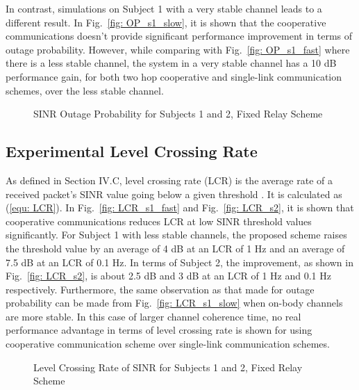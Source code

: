 \documentclass[12pt,draftcls,a4paper,onecolumn,journal]{IEEEtran}
\begin{document}
In contrast, simulations on Subject 1 with a very stable channel leads to a different result. In Fig.~\ref{fig: OP_s1_slow}, it is shown that the cooperative communications doesn't provide significant performance improvement in terms of outage probability. However, while comparing with Fig.~\ref{fig: OP_s1_fast} where there is a less stable channel, the system in a very stable channel has a 10 dB  performance gain, for both two hop cooperative and single-link communication schemes, over the less stable channel.

\begin{figure}[]
\centering
{}
\caption{SINR Outage Probability for Subjects 1 and 2, Fixed Relay Scheme}
\label{fig: outage probability}
\end{figure}


\subsection{Experimental Level Crossing Rate}
As defined in Section IV.C, level crossing rate (LCR) is the average rate of a received packet's SINR value going below a given threshold . It is calculated as (\ref{equ: LCR}). In Fig.~\ref{fig: LCR_s1_fast} and Fig.~\ref{fig: LCR_s2}, it is shown that cooperative communications reduces LCR at low SINR threshold values significantly. For Subject 1 with less stable channels, the proposed scheme raises the threshold value by an average of 4 dB at an LCR of 1 Hz and an average of 7.5 dB at an LCR of 0.1 Hz. In terms of Subject 2, the improvement, as shown in Fig.~\ref{fig: LCR_s2}, is about 2.5 dB and 3 dB at an LCR of 1 Hz and 0.1 Hz respectively. Furthermore, the same observation as that made for outage probability can be made from Fig.~\ref{fig: LCR_s1_slow} when on-body channels are more stable. In this case of larger channel coherence time, no real performance advantage in terms of level crossing rate is shown for using cooperative communication scheme over single-link communication schemes.

\begin{figure}[]
\centering
{}
\caption{Level Crossing Rate of SINR for Subjects 1 and 2,  Fixed Relay Scheme}
\label{fig: level crossing rate}
\end{figure}
\end{document}
